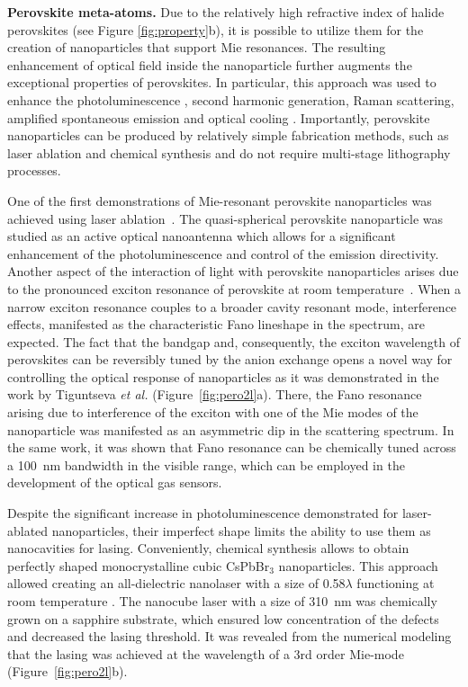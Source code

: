 \documentclass[journal=chreay,manuscript=review]{achemso}
\begin{document}
\textbf{Perovskite meta-atoms.}
Due to the relatively high refractive index of halide perovskites (see Figure \ref{fig:property}b), it is possible to utilize them for the creation of nanoparticles that support Mie resonances. The resulting enhancement of optical field inside the nanoparticle further augments the exceptional properties of perovskites. %
In particular, this approach was used to enhance the photoluminescence \cite{tiguntseva2018light}, second harmonic generation, Raman scattering, amplified spontaneous emission \cite{tiguntseva2020room} and optical cooling \cite{tonkaev2019optical}. Importantly, perovskite nanoparticles can be produced by relatively simple fabrication methods, such as laser ablation \cite{tiguntseva2018light, tiguntseva2018tunable} and chemical synthesis \cite{tiguntseva2020room} and do not require multi-stage lithography processes.
 

One of the first demonstrations of Mie-resonant perovskite nanoparticles was achieved using laser ablation~\cite{tiguntseva2018light}. The quasi-spherical perovskite nanoparticle was studied as an active optical nanoantenna which allows for a significant enhancement of the photoluminescence and control of the emission directivity. Another aspect of the interaction of light with perovskite nanoparticles arises due to the pronounced exciton resonance of perovskite at room temperature~\cite{palmieri2020mahan}. When a narrow exciton resonance couples to a broader cavity resonant mode, interference effects, manifested as the characteristic Fano lineshape in the spectrum, are expected. The fact that the bandgap and, consequently, the exciton wavelength of perovskites can be reversibly tuned by the anion exchange opens a novel way for controlling the optical response of nanoparticles as it was demonstrated in the work by Tiguntseva \textit{et al.}\cite{tiguntseva2018tunable} (Figure~\ref{fig:pero2l}a). There, the Fano resonance arising due to interference of the exciton with one of the Mie modes of the nanoparticle was manifested as an asymmetric dip in the scattering spectrum. In the same work, it was shown that Fano resonance can be chemically tuned across a 100~nm bandwidth in the visible range, which can be employed in the development of the optical gas sensors. 

Despite the significant increase in photoluminescence demonstrated for laser-ablated nanoparticles, their imperfect shape limits the ability to use them as nanocavities for lasing. Conveniently, chemical synthesis allows to obtain perfectly shaped monocrystalline cubic CsPbBr$_3$ nanoparticles. This approach allowed creating an all-dielectric nanolaser with a size of 0.58$\lambda$ functioning at room temperature \cite{tiguntseva2020room}. The nanocube laser with a size of 310~nm was chemically grown on a sapphire substrate, which ensured low concentration of the defects and decreased the lasing threshold. It was revealed from the numerical modeling that the lasing was achieved at the wavelength of a 3rd order Mie-mode (Figure~\ref{fig:pero2l}b).
\end{document}

